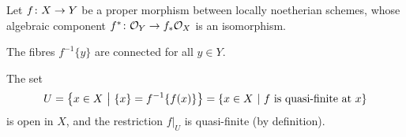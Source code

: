 \documentclass[a4paper,parskip=half,numbers=enddot, DIV=12]{scrreprt}
\begin{document}
\begin{thm}
	Let $f\colon X\morphism Y$ be a proper morphism between locally noetherian schemes, whose algebraic component $f^*\colon \Oo_Y\morphism f_*\Oo_X$ is an isomorphism.
	\begin{alphanumerate}
		\item The fibres $f^{-1}\{y\}$ are connected for all $y\in Y$.
		\item The set
		\begin{align*}
			U=\left\{x\in X\ \middle|\  \{x\}=f^{-1}\{f(x)\}\right\}=\left\{x\in X\ \middle|\  f\text{ is quasi-finite at }x\right\}
		\end{align*}
		is open in $X$, and the restriction $f|_U$ is quasi-finite (by definition).
	\end{alphanumerate}
\end{thm}
\end{document}
